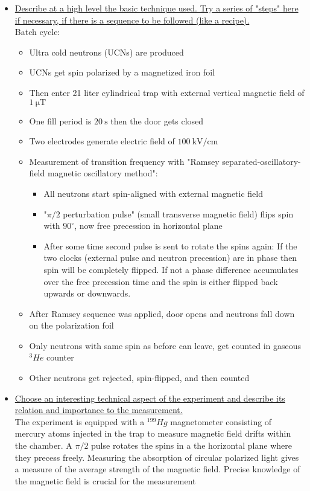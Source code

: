 \documentclass[12pt]{article}
\begin{document}
\begin{itemize}
	\item \ul{Describe at a high level the basic technique used. Try a series of "steps" here if necessary, if there is a sequence to be followed (like a recipe).} \\
	\noindent
	Batch cycle:
	\begin{itemize}
		\item Ultra cold neutrons (UCNs) are produced 
		\item UCNs get spin polarized by a magnetized iron foil
		\item Then enter 21 liter cylindrical trap with external vertical magnetic field of $\SI{1}{\micro\tesla}$
		\item One fill period is $\SI{20}{\second}$ then the door gets closed
		\item Two electrodes generate electric field of $\SI{100}{\kilo\volt\per\centi\meter}$
		\item Measurement of transition frequency with "Ramsey separated-oscillatory-field magnetic oscillatory method":
		\begin{itemize}
			\item All neutrons start spin-aligned with external magnetic field
			\item "$\pi/2$ perturbation pulse" (small transverse magnetic field) flips spin with $90^{\circ}$, now free precession in horizontal plane
			\item After some time second pulse is sent to rotate the spins again: If the two clocks (external pulse and neutron precession) are in phase then spin will be completely flipped. If not a phase difference accumulates over the free precession time and the spin is either flipped back upwards or downwards.
		\end{itemize}
		\item After Ramsey sequence was applied, door opens and neutrons fall down on the polarization foil
		\item Only neutrons with same spin as before can leave, get counted in gaseous $^{3}He$ counter
		\item Other neutrons get rejected, spin-flipped, and then counted
	\end{itemize}

	\item \ul{Choose an interesting technical aspect of the experiment and describe its relation and importance to the measurement.} \\
	\noindent
	The experiment is equipped with a $^{199}Hg$ magnetometer consisting of mercury atoms injected in the trap to measure magnetic field drifts within the chamber. A $\pi/2$ pulse rotates the spins in a the horizontal plane where they precess freely. Measuring the absorption of circular polarized light gives a measure of the average strength of the magnetic field. Precise knowledge of the magnetic field is crucial for the measurement
	

\end{itemize}
\end{document}
